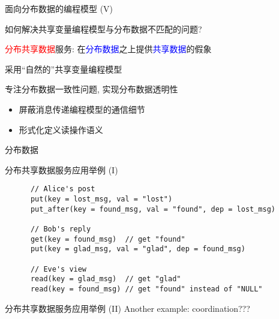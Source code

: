 \begin{frame}{面向分布数据的编程模型 (V)}
  \begin{cquestion}
    如何解决共享变量编程模型与分布数据不匹配的问题?
  \end{cquestion}

  \vspace{0.30cm}
  \begin{center}
    {\large \textcolor{red}{分布共享数据}服务: 在\textcolor{blue}{分布数据}之上提供\textcolor{blue}{共享数据}的假象}
  \end{center}
  
  \begin{description}
    \item<2->[业务层:] 采用``自然的''共享变量编程模型
    \item<3->[分布共享数据服务:] 专注分布数据一致性问题, 实现分布数据透明性
      \begin{itemize}
	\item 屏蔽消息传递编程模型的通信细节
	\item 形式化定义读操作语义
      \end{itemize}
    \item<2->[数据层:] 分布数据
  \end{description}
\end{frame}
\begin{frame}[fragile]{分布共享数据服务应用举例 (I)}
    \begin{lstlisting}
      // Alice's post
      put(key = lost_msg, val = "lost")
      put_after(key = found_msg, val = "found", dep = lost_msg)

      // Bob's reply
      get(key = found_msg)  // get "found"
      put(key = glad_msg, val = "glad", dep = found_msg)

      // Eve's view
      read(key = glad_msg)  // get "glad"
      read(key = found_msg) // get "found" instead of "NULL"
    \end{lstlisting}
\end{frame}
\begin{frame}{分布共享数据服务应用举例 (II)}
  Another example: coordination???
\end{frame}
